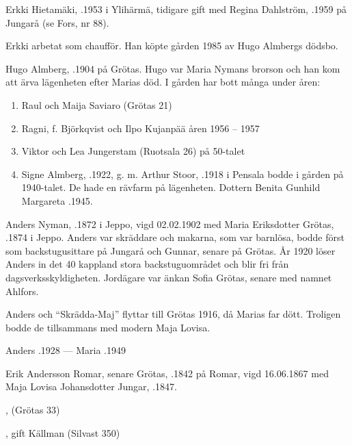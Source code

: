 Erkki Hietamäki, .1953 i Ylihärmä, tidigare gift med Regina Dahlström, .1959  på Jungarå (se Fors, nr 88).
\begin{jhchildren}
  \item {}
  \item {}
\end{jhchildren}

Erkki arbetat som chaufför. Han köpte gården 1985 av Hugo Almbergs dödsbo.


Hugo Almberg, .1904 på Grötas. Hugo var Maria Nymans brorson och han kom att ärva lägenheten efter Marias död. I gården har bott många  under åren:
\begin{enumerate}
  \item Raul och Maija Saviaro (Grötas  21)
  \item Ragni, f. Björkqvist och Ilpo Kujanpää åren 1956 – 1957
  \item Viktor och Lea Jungerstam (Ruotsala 26) på 50-talet
  \item Signe Almberg, .1922, g. m. Arthur Stoor, .1918  i Pensala bodde i gården på 1940-talet. De hade en rävfarm på lägenheten. Dottern Benita Gunhild Margareta .1945.
\end{enumerate}


Anders Nyman, .1872 i Jeppo, vigd 02.02.1902 med Maria Eriksdotter Grötas, .1874 i Jeppo. Anders var skräddare och makarna, som var barnlösa, bodde först som backstugusittare på Jungarå och Gunnar, senare på Grötas. År 1920 löser Anders in det 40 kappland stora backstuguområdet och blir fri från dagsverksskyldigheten. Jordägare var änkan Sofia Grötas, senare  med namnet Ahlfors.

Anders och ``Skrädda-Maj'' flyttar till Grötas 1916, då Marias far dött. Troligen bodde de tillsammans med modern Maja Lovisa.

Anders .1928  ---  Maria .1949


Erik Andersson Romar, senare Grötas, .1842 på Romar, vigd 16.06.1867 med Maja Lovisa Johansdotter Jungar, .1847.
\begin{jhchildren}
  \item {}, (Grötas 33)
  \item {}
  \item {}, gift Källman (Silvast 350)
\end{jhchildren}

